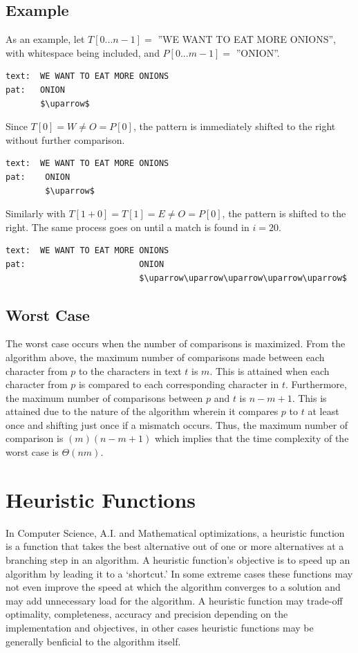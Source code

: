 \subsection{Example}
As an example, let $T[0...n-1]=$ ''WE WANT TO EAT MORE ONIONS'', with whitespace being included, and $P[0...m-1]=$ ''ONION''.


\begin{lstlisting}
text:  WE WANT TO EAT MORE ONIONS
pat:   ONION
       $\uparrow$
\end{lstlisting}

Since $T[0] = W \neq O = P[0]$, the pattern is immediately shifted to the right without further comparison.

\begin{lstlisting}
text:  WE WANT TO EAT MORE ONIONS
pat:    ONION
        $\uparrow$
\end{lstlisting}

Similarly with $T[1+0] = T[1] = E \neq O = P[0]$, the pattern is shifted to the right. The same process goes on until a match is found in $i=20$.

\begin{lstlisting}
text:  WE WANT TO EAT MORE ONIONS
pat:                       ONION
                           $\uparrow\uparrow\uparrow\uparrow\uparrow$
\end{lstlisting}

\subsection{Worst Case}\cite{bfworst}    
The worst case occurs when the number of comparisons is maximized. From the algorithm above, the maximum number of comparisons made between each character from $p$ to the characters in text $t$ is $m$. This is attained when each character from $p$ is compared to each corresponding character in $t$. Furthermore, the maximum number of comparisons between $p$ and $t$ is $n-m+1$. This is attained due to the nature of the algorithm wherein it compares $p$ to $t$ at least once and shifting just once if a mismatch occurs. Thus, the maximum number of comparison is $(m)(n-m+1)$ which implies that the time complexity of the worst case is $\Theta(nm)$.

\section{Heuristic Functions}
In Computer Science, A.I. and Mathematical optimizations, a heuristic function is a function that takes the best alternative out of one or more alternatives at a branching step in an algorithm. A heuristic function's objective is to speed up an algorithm by leading it to a `shortcut.' In some extreme cases these functions may not even improve the speed at which the algorithm converges to a solution and may add unnecessary load for the algorithm. A heuristic function may trade-off optimality, completeness, accuracy and precision depending on the implementation and objectives, in other cases heuristic functions may be generally benficial to the algorithm itself. \\

